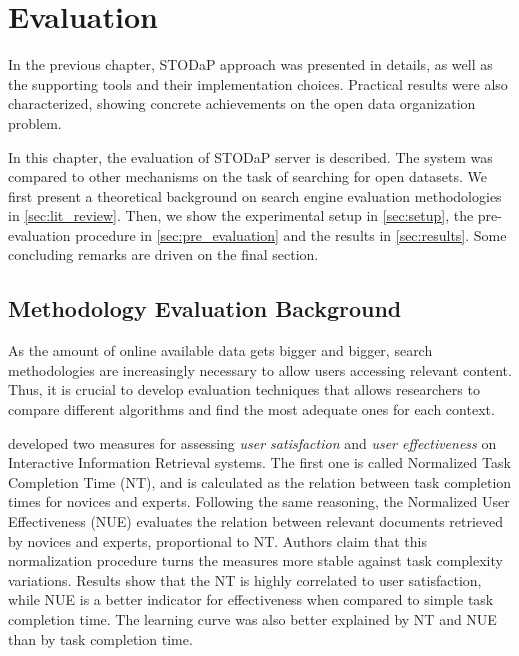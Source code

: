 \chapter{Evaluation}
\label{chap:evaluation}

In the previous chapter, STODaP approach was presented in details, as well as the supporting tools and their implementation choices.
Practical results were also characterized, showing concrete achievements on the open data organization problem.

In this chapter, the evaluation of STODaP server is described.
The system was compared to other mechanisms on the task of searching for open datasets.
We first present a theoretical background on search engine evaluation methodologies in \autoref{sec:lit_review}.
Then, we show the experimental setup in \autoref{sec:setup}, the pre-evaluation procedure in \autoref{sec:pre_evaluation} and the results in \autoref{sec:results}.
Some concluding remarks are driven on the final section.

\section{Methodology Evaluation Background}
\label{sec:lit_review}

As the amount of online available data gets bigger and bigger, search methodologies are increasingly necessary to allow users accessing relevant content.
Thus, it is crucial to develop evaluation techniques that allows researchers to compare different algorithms and find the most adequate ones for each context.

 developed two measures for assessing \emph{user satisfaction} and \emph{user effectiveness} on Interactive Information Retrieval systems.
The first one is called Normalized Task Completion Time (NT), and is calculated as the relation between task completion times for novices and experts.
Following the same reasoning, the Normalized User Effectiveness (NUE) evaluates the relation between relevant documents retrieved by novices and experts, proportional to NT.
Authors claim that this normalization procedure turns the measures more stable against task complexity variations.
Results show that the NT is highly correlated to user satisfaction, while NUE is a better indicator for effectiveness when compared to simple task completion time.
The learning curve was also better explained by NT and NUE than by task completion time.

